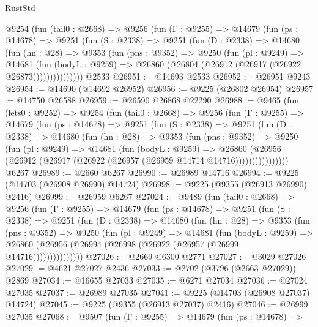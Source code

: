 \begin{lexlean}{RustStd}
\begin{coremodule}
      @9254
        (fun (tail0 : @2668) =>
        @9256
          (fun (Γ : @9255) =>
          @14679
            (fun (ps : @14678) =>
            @9251
              (fun (S : @2338) =>
              @9251
                (fun (D : @2338) =>
                @14680
                  (fun (hn : @28) =>
                  @9353
                    (fun (pns : @9352) =>
                    @9250
                      (fun (pl : @9249) =>
                      @14681
                        (fun (bodyL : @9259) =>
                        @26860 (@26804 (@26912 (@26917 (@26922 @26873)))))))))))))))
    @2533
@26951 := @14693 @2533
@26952 := @26951 @9243
@26954 := @14690 (@14692 @26952)
@26956 := @9225 (@26802 @26954)
@26957 := @14750 @26588
@26959 := @26590 @26868 @22290
@26988 := @9465
    (fun (lets0 : @9252) =>
    @9254
      (fun (tail0 : @2668) =>
      @9256
        (fun (Γ : @9255) =>
        @14679
          (fun (ps : @14678) =>
          @9251
            (fun (S : @2338) =>
            @9251
              (fun (D : @2338) =>
              @14680
                (fun (hn : @28) =>
                @9353
                  (fun (pns : @9352) =>
                  @9250
                    (fun (pl : @9249) =>
                    @14681
                      (fun (bodyL : @9259) =>
                      @26860
                        (@26956
                          (@26912 (@26917 (@26922 (@26957 (@26959 @14714 @14716))))))))))))))))
    @6267
@26989 := @2660 @6267
@26990 := @26989 @14716
@26994 := @9225 (@14703 (@26908 @26990) @14724)
@26998 := @9225 (@9355 (@26913 @26990) @2416)
@26999 := @26959 @6267
@27024 := @9489
    (fun (tail0 : @2668) =>
    @9256
      (fun (Γ : @9255) =>
      @14679
        (fun (ps : @14678) =>
        @9251
          (fun (S : @2338) =>
          @9251
            (fun (D : @2338) =>
            @14680
              (fun (hn : @28) =>
              @9353
                (fun (pns : @9352) =>
                @9250
                  (fun (pl : @9249) =>
                  @14681
                    (fun (bodyL : @9259) =>
                    @26860 (@26956 (@26994 (@26998 (@26922 (@26957 (@26999 @14716)))))))))))))))
@27026 := @2669 @6300 @2771
@27027 := @3029 @27026
@27029 := @4621 @27027 @2436
@27033 := @2702 (@3796 (@2663 @27029)) @2869
@27034 := @16655 @27033
@27035 := @6271 @27034
@27036 := @27024 @27035
@27037 := @26989 @27035
@27041 := @9225 (@14703 (@26908 @27037) @14724)
@27045 := @9225 (@9355 (@26913 @27037) @2416)
@27046 := @26999 @27035
@27068 := @9507
    (fun (Γ : @9255) =>
    @14679
      (fun (ps : @14678) =>

\end{coremodule}
\end{lexlean}
